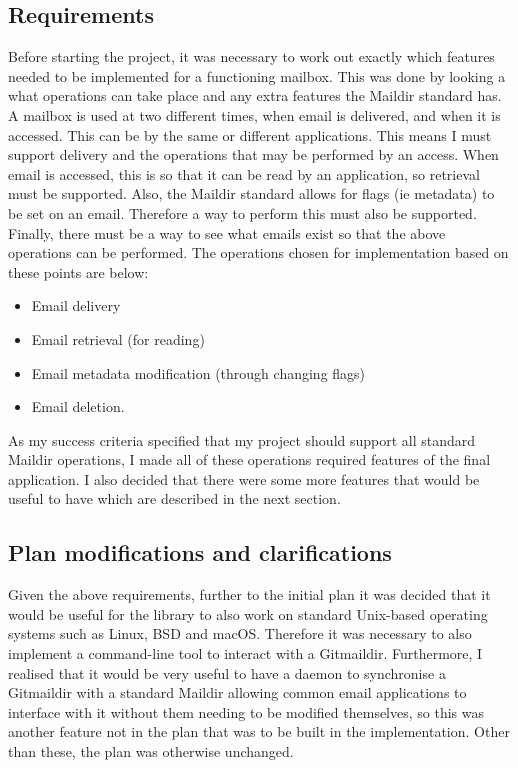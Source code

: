 \subsection{Requirements}

Before starting the project, it was necessary to work out exactly which features needed to be implemented for a functioning mailbox. This was done by looking a what operations can take place and any extra features the Maildir standard has. A mailbox is used at two different times, when email is delivered, and when it is accessed. This can be by the same or different applications. This means I must support delivery and the operations that may be performed by an access. When email is accessed, this is so that it can be read by an application, so retrieval must be supported. Also, the Maildir standard allows for flags (ie metadata) to be set on an email. Therefore a way to perform this must also be supported. Finally, there must be a way to see what emails exist so that the above operations can be performed. The operations chosen for implementation based on these points are below:

\begin{itemize}
  \item Email delivery
  \item Email retrieval (for reading)
  \item Email metadata modification (through changing flags)
  \item Email deletion.
\end{itemize}

As my success criteria specified that my project should support all standard Maildir operations, I made all of these operations required features of the final application. I also decided that there were some more features that would be useful to have which are described in the next section.

\subsection{Plan modifications and clarifications}

Given the above requirements, further to the initial plan it was decided that it would be useful for the library to also work on standard Unix-based operating systems such as Linux, BSD and macOS. Therefore it was necessary to also implement a command-line tool to interact with a Gitmaildir. Furthermore, I realised that it would be very useful to have a daemon to synchronise a Gitmaildir with a standard Maildir allowing common email applications to interface with it without them needing to be modified themselves, so this was another feature not in the plan that was to be built in the implementation. Other than these, the plan was otherwise unchanged.

